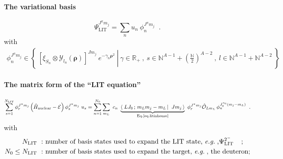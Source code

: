 \documentclass[onecolumn,preprint,superscriptaddress,nofootinbib,notitlepage,10pt,linenumbers]{revtex4-1}
\newcommand{\eg}{\textit{e.g.}\;}
\newcommand{\be}{\begin{equation}}
\newcommand{\ee}{\end{equation}}
\newcommand{\la}{\label}
\newcommand{\ve}[1]{\ensuremath{\boldsymbol{#1}}}
\newcommand{\clg}[6]{\ensuremath{\left\langle\left.\,#1#2\,;\,#3#4\,\right\vert\right.\left.\,#5#6\,\right\rangle}}
\newcommand{\E}{\mathcal{E}}
\begin{document}
\paragraph{The variational basis}
\be\la{eq.basis}
\Psi_\text{LIT}^{J^\pi m_j}=\sum\limits_nu_n~\phi^{J^\pi m_j}_n\;\;.
\ee
with
\begin{align}\la{eq.basis.descr}
\phi^{J^\pi m_j}_n\in\left\lbrace~\left.
\left[\xi_{S_n}\otimes\mathcal{Y}_{l_n}(\ve{\rho})\right]^{J m_j}~
e^{-\gamma_n\ve{\rho}^2}~
\right\vert~\gamma\in\mathbb{R}_+~,~s\in\mathbb{N}^{A-1}+\left(\frac{\mathbb{N}}{2}\right)^{A-2}~,~l\in\mathbb{N}^{A-1}+\mathbb{N}^{A-2}~\right\rbrace
\end{align}

\paragraph{The matrix form of the ``LIT equation''}
\be\la{eq.liteq.mat}
\sum\limits_{s=1}^{N_\text{LIT}}\phi^{J^\pi m_j}_r\left(\hat{H}_\text{nuclear}-\E\right)\phi^{J^\pi m_j}_s~u_s=
\sum\limits_{n=1}^{N_0}\sum\limits_{m_L}~c_n~\underbrace{\clg{L}{J_0}{m_L}{m_j-m_L}{J}{m_j}}_{\text{Eq.\eqref{eq.litinhomo}}}~\phi^{J^\pi m_j}_r\hat{\mathcal{O}}_{Lm_L}\,\phi^{J_0^{\pi_0}(m_j-m_L)}_n\;\;.
\ee
with
\begin{align}\la{eq.liteq.mat.descr}
N_\text{LIT}~:&~\text{number of basis states used to expand the LIT state, \eg,} \Psi_\text{LIT}^{2^-}\;\;\;\;;\\
N_0\leq N_\text{LIT}~:&~\text{number of basis states used to expand the target, \eg, the deuteron;}\\
\end{align}
\end{document}

